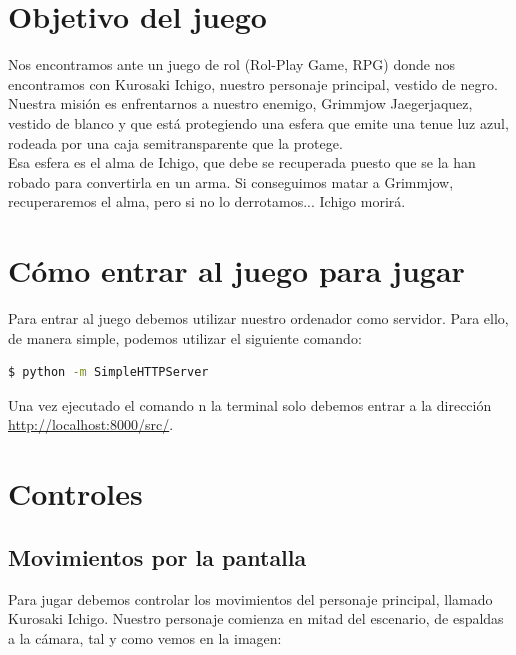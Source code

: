 \documentclass[11pt,a4paper]{article}
\begin{document}
\newpage

\section{Objetivo del juego}

Nos encontramos ante un juego de rol (Rol-Play Game, RPG) donde nos encontramos con Kurosaki Ichigo, nuestro personaje principal, vestido de negro.\\

Nuestra misión es enfrentarnos a nuestro enemigo, Grimmjow Jaegerjaquez, vestido de blanco y que está protegiendo una esfera que emite una tenue luz azul, rodeada por una caja semitransparente que la protege.\\

Esa esfera es el alma de Ichigo, que debe se recuperada puesto que se la han robado para convertirla en un arma. Si conseguimos matar a Grimmjow, recuperaremos el alma, pero si no lo derrotamos... Ichigo morirá.

\section{Cómo entrar al juego para jugar}

Para entrar al juego debemos utilizar nuestro ordenador como servidor. Para ello, de manera simple, podemos utilizar el siguiente comando:

\begin{lstlisting}[language=bash]
$ python -m SimpleHTTPServer
\end{lstlisting}

Una vez ejecutado el comando n la terminal solo debemos entrar a la dirección \color{blue}\url{http://localhost:8000/src/}\color{black}.

\section{Controles}

\subsection{Movimientos por la pantalla}

Para jugar debemos controlar los movimientos del personaje principal, llamado Kurosaki Ichigo. Nuestro personaje comienza en mitad del escenario, de espaldas a la cámara, tal y como vemos en la imagen:
\end{document}
